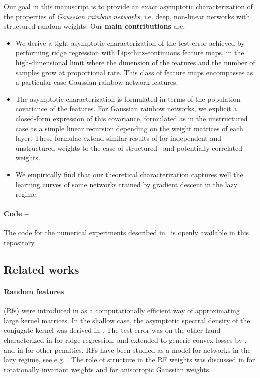 Our goal in this manuscript is to provide an exact asymptotic characterization of the properties of \emph{Gaussian rainbow networks}, i.e. deep, non-linear networks with structured random weights. Our \textbf{main contributions} are:
\begin{itemize}
    \item We derive a tight asymptotic characterization of the test error achieved by performing ridge regression with Lipschitz-continuous feature maps, in the high-dimensional limit where the dimension of the features and the number of samples grow at proportional rate. This class of feature maps encompasses as a particular case Gaussian rainbow network features.
    \item The asymptotic characterization is formulated in terms of the population covariance of the features. For Gaussian rainbow networks, we explicit a closed-form expression of this covariance, formulated as in the unstructured case \cite{schroder2023deterministic} as a simple linear recursion depending on the weight matrices of each layer. These formulae extend similar results of \cite{Cui2023, schroder2023deterministic} for independent and unstructured weights to the case of structured --and potentially correlated-- weights.
    \item We empirically find that our theoretical characterization captures well the learning curves of some networks trained by gradient descent in the lazy regime.
\end{itemize}
\paragraph{Code --} The code for the numerical experiments described in~ is openly available in  \href{https://github.com/wirhabenzeit/feature-ridge-regression}{this repository.}

\subsection*{Related works}
\paragraph{Random features} (Rfs) were introduced in \cite{Rahimi2007RandomFF} as a computationally efficient way of approximating large kernel matrices. In the shallow case, the asymptotic spectral density of the conjugate kernel was derived in \cite{Liao2018, Pennington2019NonlinearRM, Benigni2021}. The test error was on the other hand characterized in \cite{Mei2019TheGE, Mei2021GeneralizationEO} for ridge regression, and extended to generic convex losses by \cite{Gerace2020GeneralisationEI, Goldt2021TheGE, Dhifallah2020}, and in \cite{Sur2020, Loureiro2021CapturingTL, Bosch2022} for other penalties. RFs have been studied as a model for networks in the lazy regime, see e.g. \cite{Ghorbani2019, Ghorbani2020WhenDN, NEURIPS2019_5481b2f3, pmlr-v139-refinetti21b}. The role of structure in the RF weights was discussed in \cite{Gerace2022} for rotationally invariant weights and \cite{mel2022anisotropic, pandey2022structured} for anisotropic Gaussian weights.
